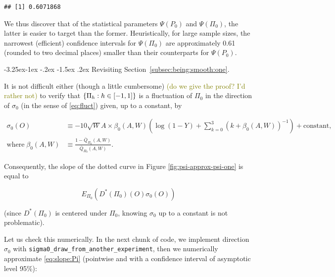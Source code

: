 \documentclass[]{article}
\makeatletter
\renewcommand\subsection{\@startsection{subsection}{3}{\z@}%
                                     {-3.25ex\@plus -1ex \@minus -.2ex}%
                                     {-1.5ex \@plus .2ex}%
                                     {\normalfont\normalsize\bfseries}}
\newcommand{\Qbar}{\bar{Q}}
\newcommand{\tcg}[1]{\textcolor{olive}{#1}}
\theoremstyle{definition}
\theoremstyle{definition}
\theoremstyle{definition}
\theoremstyle{remark}
\makeatother
\begin{document}
\begin{verbatim}
## [1] 0.6071868
\end{verbatim}

We thus discover that of the statistical parameters \(\Psi(P_{0})\) and
\(\Psi(\Pi_{0})\), the latter is easier to target than the former.
Heuristically, for large sample sizes, the narrowest (efficient)
confidence intervals for \(\Psi(\Pi_{0})\) are approximately 0.61
(rounded to two decimal places) smaller than their counterparts for
\(\Psi(P_{0})\).

\subsection{Revisiting Section~\ref{subsec:being:smooth:one}.}

It is not difficult either (though a little cumbersome)
\tcg{(do we give the
proof? I'd rather not)} to verify that
\(\{\Pi_{h} : h \in \interval{-1}{1}\}\) is a fluctuation of \(\Pi_{0}\)
in the direction of \(\sigma_{0}\) (in the sense of \eqref{eq:fluct})
given, up to a constant, by

\begin{align*}\sigma_{0}(O)  &\equiv -  10  \sqrt{W}  A \times  \beta_{0}(A,W)
\left(\log(1    -     Y)    +     \sum_{k=0}^{3}    \left(k     +    \beta_{0}
(A,W)\right)^{-1}\right)     +      \text{constant},\\     \text{where}     \;
\beta_{0}(A,W)&\equiv                                                  \frac{1
-\Qbar_{\Pi_{0}}(A,W)}{\Qbar_{\Pi_{0}}(A,W)}.\end{align*}

Consequently, the slope of the dotted curve in Figure
\ref{fig:psi-approx-psi-one} is equal to

\begin{equation}\label{eq:slope:Pi}E_{\Pi_{0}}       (D^{*}(\Pi_{0})       (O)
\sigma_{0}(O))\end{equation}

(since \(D^{*}(\Pi_{0})\) is centered under \(\Pi_{0}\), knowing
\(\sigma_{0}\) up to a constant is not problematic).

Let us check this numerically. In the next chunk of code, we implement
direction \(\sigma_{0}\) with
\texttt{sigma0\_draw\_from\_another\_experiment}, then we numerically
approximate \eqref{eq:slope:Pi} (pointwise and with a confidence
interval of asymptotic level 95\%):
\end{document}
